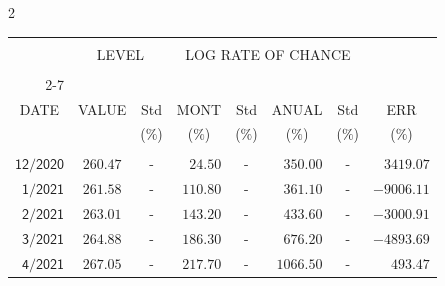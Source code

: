 \begin{multicols}{2}{ 
\begin{tabular}{rccrcrcr} 
\hline 
 \multicolumn{1}{|c|}{}  &  \multicolumn{2}{c|}{} & 
\multicolumn{4}{c}{} & \multicolumn{1}{|c|}{}\vspace{-.10in}\\ 
\multicolumn{1}{|c|}{}  &  \multicolumn{2}{c|}{LEVEL} & 
\multicolumn{4}{c}{LOG RATE OF CHANCE} & \multicolumn{1}{|c|}{}    \\  
\multicolumn{1}{|c|}{}  &  \multicolumn{2}{c|}{} & 
\multicolumn{4}{c}{} & \multicolumn{1}{|c|}{}\vspace{-.10in}\\ \cline{2-7} 
\multicolumn{1}{|c|}{ } &\multicolumn{1}{c|}{ } & \multicolumn{1}{c|}{} & \multicolumn{1}{c|}{} & \multicolumn{1}{c|}{}     & \multicolumn{1}{c|}{} & \multicolumn{1}{c|}{}  & \multicolumn{1}{c|}{}  \vspace{-.05in}\\  
\multicolumn{1}{|c|}{DATE } &\multicolumn{1}{c|}{ VALUE} & \multicolumn{1}{c|}{Std} & \multicolumn{1}{c|}{MONT} & \multicolumn{1}{c|}{Std}     & \multicolumn{1}{c|}{ANUAL} & \multicolumn{1}{c|}{Std}  & \multicolumn{1}{c|}{ERR}\\  
\multicolumn{1}{|c|}{ }      & \multicolumn{1}{c|}{  }    & \multicolumn{1}{c|}{($\%$)}&  \multicolumn{1}{c|}{($\%$)  }  & \multicolumn{1}{c|}{($\%$)} & \multicolumn{1}{c|}{($\%$) }     & \multicolumn{1}{c|}{ ($\%$) }  &  \multicolumn{1}{c|}{ ($\%$) } \\  
 \hline 
 \\$\mathsf{      12/2020}$ &$\mathsf{   260.47}$ &     - &$\mathsf{   24.50}$ &     - &$\mathsf{   350.00 }$ &     - &$\mathsf{3419.07} $ \vspace{-.005in}\\ 
$\mathsf{       1/2021}$ &$\mathsf{   261.58}$ &     - &$\mathsf{  110.80}$ &     - &$\mathsf{   361.10 }$ &     - &$\mathsf{-9006.11} $ \vspace{-.005in}\\ 
$\mathsf{       2/2021}$ &$\mathsf{   263.01}$ &     - &$\mathsf{  143.20}$ &     - &$\mathsf{   433.60 }$ &     - &$\mathsf{-3000.91} $ \vspace{-.005in}\\ 
$\mathsf{       3/2021}$ &$\mathsf{   264.88}$ &     - &$\mathsf{  186.30}$ &     - &$\mathsf{   676.20 }$ &     - &$\mathsf{-4893.69} $ \vspace{-.005in}\\ 
$\mathsf{       4/2021}$ &$\mathsf{   267.05}$ &     - &$\mathsf{  217.70}$ &     - &$\mathsf{  1066.50 }$ &     - &$\mathsf{ 493.47} $ \vspace{-.005in}\\ 

\end{tabular}}
\end{multicols}
